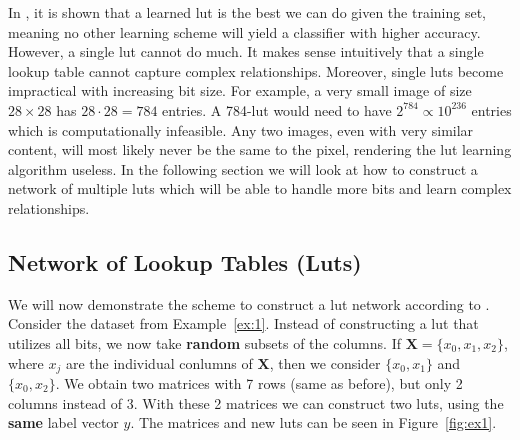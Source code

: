 \noindent In \cite{chatterjee2018learning}, it is shown that a learned lut is the best we can do given the training set, meaning no other learning scheme will yield a classifier with higher accuracy. However, a single lut cannot do much. It makes sense intuitively that a single lookup table cannot capture complex relationships. Moreover, single luts become impractical with increasing bit size. For example, a very small image of size $28 \times 28$ has $28 \cdot 28 = 784$ entries. A 784-lut would need to have $2^{784} \propto 10^{236}$ entries which is computationally infeasible. Any two images, even with very similar content, will most likely never be the same to the pixel, rendering the lut learning algorithm useless. In the following section we will look at how to construct a network of multiple luts which will be able to handle more bits and learn complex relationships.

\subsection{Network of Lookup Tables (Luts)}
We will now demonstrate the scheme to construct a lut network according to \cite{chatterjee2018learning}. Consider the dataset from Example~\ref{ex:1}. Instead of constructing a lut that utilizes all bits, we now take \textbf{random} subsets of the columns. If $\bm{X} = \{x_0,x_1,x_2\}$, where $x_j$ are the individual conlumns of $\bm{X}$, then we consider $\{x_0,x_1\}$ and $\{x_0,x_2\}$. We obtain two matrices with 7 rows (same as before), but only 2 columns instead of 3. With these 2 matrices we can construct two luts, using the \textbf{same} label vector $y$. The matrices and new luts can be seen in Figure~\ref{fig:ex1}.

